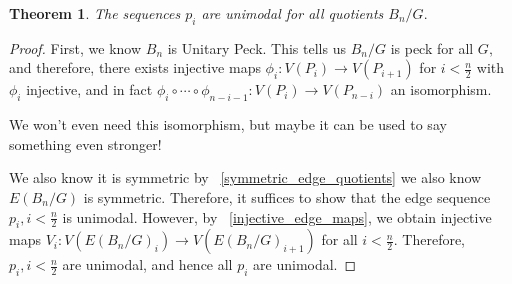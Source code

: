 \documentclass{amsart}
\newtheorem{thm}[subsubsection]{Theorem}
\begin{document}
\begin{thm}
The sequences $p_i$ are unimodal for all quotients $B_n/G.$ 
\end{thm}
\begin{proof}
First, we know $B_n$ is Unitary Peck. This tells us $B_n/G$ is peck for all $G,$ and therefore, there exists injective maps $\phi_i:V(P_i) \rightarrow V(P_{i+1})$ for $i <\frac{n}{2}$	with $\phi_i$ injective, and in fact $\phi_i \circ \cdots \circ \phi_{n-i-1}:V(P_i) \rightarrow V(P_{n-i})$ an isomorphism.

We won't even need this isomorphism, but maybe it can be used to say something even stronger!

We also know it is symmetric by ~\ref{symmetric_edge_quotients} we also know $E(B_n/G)$ is symmetric. Therefore, it suffices to show that the edge sequence $p_i, i < \frac{n}{2}$ is unimodal. However, by ~\ref{injective_edge_maps}, we obtain injective maps $V_i:V(E(B_n/G)_i)\rightarrow V(E(B_n/G)_{i+1})$ for all $i < \frac{n}{2}.$ Therefore, $p_i,i<\frac{n}{2}$ are unimodal, and hence all $p_i$ are unimodal.

\end{proof}
\end{document}
